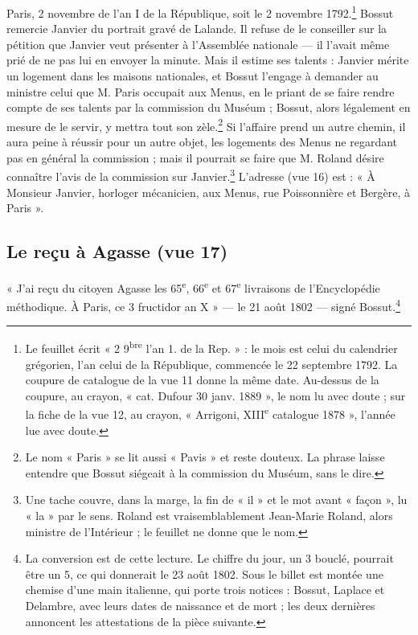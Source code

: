 \documentclass[11pt,a4paper]{article}
\begin{document}
Paris, 2 novembre de l'an I de la République, soit le 2 novembre
1792.\footnote{Le feuillet écrit « 2 9\textsuperscript{bre} l'an 1. de la
Rep. » : le mois est celui du calendrier grégorien, l'an celui de la
République, commencée le 22 septembre 1792. La coupure de catalogue de la
vue 11 donne la même date. Au-dessus de la coupure, au crayon, « cat. Dufour
30 janv. 1889 », le nom lu avec doute ; sur la fiche de la vue 12, au crayon,
« Arrigoni, XIII\textsuperscript{e} catalogue 1878 », l'année lue avec doute.}
Bossut remercie Janvier du portrait gravé de Lalande. Il refuse de le
conseiller sur la pétition que Janvier veut présenter à l'Assemblée nationale
— il l'avait même prié de ne pas lui en envoyer la minute. Mais il estime ses
talents : Janvier mérite un logement dans les maisons nationales, et Bossut
l'engage à demander au ministre celui que M. Paris occupait aux Menus, en le
priant de se faire rendre compte de ses talents par la commission du Muséum ;
Bossut, alors légalement en mesure de le servir, y mettra tout son
zèle.\footnote{Le nom « Paris » se lit aussi « Pavis » et reste douteux. La
phrase laisse entendre que Bossut siégeait à la commission du Muséum, sans le
dire.} Si l'affaire prend un autre chemin, il aura peine à réussir pour un
autre objet, les logements des Menus ne regardant pas en général la
commission ; mais il pourrait se faire que M. Roland désire connaître l'avis
de la commission sur Janvier.\footnote{Une tache couvre, dans la marge, la
fin de « il » et le mot avant « façon », lu « la » par le sens. Roland est
vraisemblablement Jean-Marie Roland, alors ministre de l'Intérieur ; le
feuillet ne donne que le nom.} L'adresse (vue 16) est : « À Monsieur Janvier,
horloger mécanicien, aux Menus, rue Poissonnière et Bergère, à Paris ».

\subsection*{Le reçu à Agasse (vue 17)}

« J'ai reçu du citoyen Agasse les 65\textsuperscript{e}, 66\textsuperscript{e}
et 67\textsuperscript{e} livraisons de l'Encyclopédie méthodique. À Paris,
ce 3 fructidor an X » — le 21 août 1802 — signé Bossut.\footnote{La
conversion est de cette lecture. Le chiffre du jour, un 3 bouclé, pourrait
être un 5, ce qui donnerait le 23 août 1802. Sous le billet est montée une
chemise d'une main italienne, qui porte trois notices : Bossut, Laplace et
Delambre, avec leurs dates de naissance et de mort ; les deux dernières
annoncent les attestations de la pièce suivante.}
\end{document}
